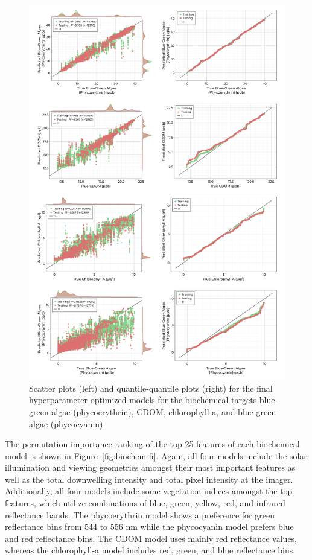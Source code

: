 \documentclass[remotesensing,article,submit,pdftex,moreauthors]{Definitions/mdpi}
\begin{document}
\begin{figure}
\centering
\includegraphics[width=\columnwidth]{paper/figures/results/fits/biochemical-fitres.png}
\caption{Scatter plots (left) and quantile-quantile plots (right) for the final hyperparameter optimized models for the biochemical targets blue-green algae (phycoerythrin), CDOM, chlorophyll-a, and blue-green algae (phycocyanin). \label{fig:biochem-fit}}
\end{figure}  

The permutation importance ranking of the top 25 features of each biochemical model is shown in Figure~\ref{fig:biochem-fi}. Again, all four models include the solar illumination and viewing geometries amongst their most important features as well as the total downwelling intensity and total pixel intensity at the imager. Additionally, all four models include some vegetation indices amongst the top features, which utilize combinations of blue, green, yellow, red, and infrared reflectance bands. The phycoerythrin model shows a preference for green reflectance bins from 544 to 556 nm while the phycocyanin model prefers blue and red reflectance bins. The CDOM model uses mainly red reflectance values, whereas the chlorophyll-a model includes red, green, and blue reflectance bins.
\end{document}
